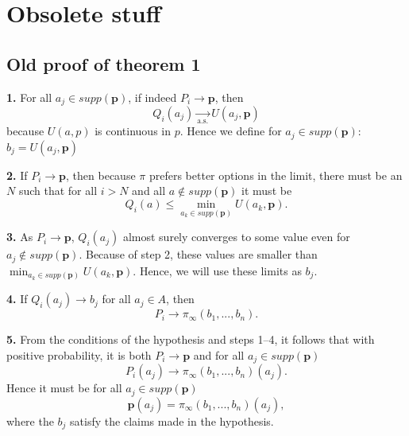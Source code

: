 \documentclass{article}
\begin{document}
\section*{Obsolete stuff}

\subsection*{Old proof of theorem 1}

\textbf{1.} For all $a_j\in supp (\mathbf{p})$, if indeed $P_i\rightarrow \mathbf{p}$, then 
\begin{equation}\label{eq:proof-part-one-main-eq}
Q_i(a_j)\underset{\text{a.s.}}{\rightarrow} U(a_j,\mathbf{p})
\end{equation}
because $U(a,p)$ is continuous in $p$. Hence we define for $a_j\in supp (\mathbf{p})$: $b_j=U(a_j,\mathbf{p})$

\textbf{2.} If $P_i\rightarrow \mathbf{p}$, then because $\pi$ prefers better options in the limit, there must be an $N$ such that for all $i>N$ and all $a\notin supp (\mathbf{p})$ it must be
\begin{equation}\label{eq:proof-part-two-main-eq}
Q_i(a)\leq \min_{a_k\in supp (\mathbf{p}) } U(a_k,\mathbf{p}).
\end{equation}

\textbf{3.} As $P_i \rightarrow \mathbf{p}$, $Q_i(a_j)$ almost surely converges to some value even for $a_j\notin supp(\mathbf{p})$. Because of step 2, these values are smaller than $\min_{a_k\in supp (\mathbf{p}) } U(a_k,\mathbf{p})$. Hence, we will use these limits as $b_j$.

\textbf{4.} If $Q_i(a_j)\rightarrow b_j$ for all $a_j\in A$, then
\begin{equation}\label{eq:proof-part-four-main-eq}
P_i \rightarrow \pi_\infty (b_1,...,b_n).
\end{equation}

\textbf{5.} From the conditions of the hypothesis and steps 1--4, it follows that with positive probability, it is both $P_i\rightarrow \mathbf{p}$ and for all $a_j\in supp(\mathbf{p})$
\begin{equation}\label{eq:proof-part-five-main-eq}
P_i(a_j) \rightarrow \pi_\infty  (b_1,...,b_n)(a_j).
\end{equation}
Hence it must be for all $a_j\in supp(\mathbf{p})$
\begin{equation}
\mathbf{p}(a_j)=\pi_\infty (b_1,...,b_n)(a_j),
\end{equation}
where the $b_j$ satisfy the claims made in the hypothesis.
\end{document}
